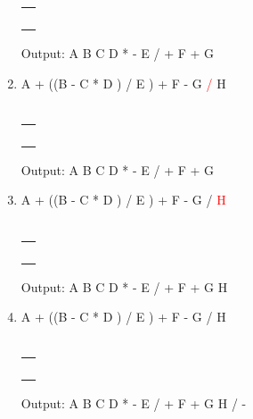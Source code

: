 \documentclass[a4paper]{article}
\begin{document}
\begin{large}
\begin{enumerate}
\begin{tabular}[t]{ | p{1em} | }
            \makecell{}  \\ \hline
            \makecell{}  \\ \hline
            \makecell{}  \\ \hline
            \\ \hline
            \makecell{-} \\ \hline
          \end{tabular}
          \hspace{2em}
          Output: A B C D * - E / + F + G
    \item
          A + ((B - C * D ) / E ) + F - G \textcolor{red}{/} H\\
          \\
          \begin{tabular}[t]{ | p{1em} | }
            \makecell{}  \\ \hline
            \makecell{}  \\ \hline
            \makecell{}  \\ \hline
            \makecell{/} \\ \hline
            \makecell{-} \\ \hline
          \end{tabular}
          \hspace{2em}
          Output: A B C D * - E / + F + G
    \item
          A + ((B - C * D ) / E ) + F - G / \textcolor{red}{H}\\
          \\
          \begin{tabular}[t]{ | p{1em} | }
            \makecell{}  \\ \hline
            \makecell{}  \\ \hline
            \makecell{}  \\ \hline
            \makecell{/} \\ \hline
            \makecell{-} \\ \hline
          \end{tabular}
          \hspace{2em}
          Output: A B C D * - E / + F + G H
    \item
          A + ((B - C * D ) / E ) + F - G / H\\
          \\
          \begin{tabular}[t]{ | p{1em} | }
            \makecell{} \\ \hline
            \makecell{} \\ \hline
            \makecell{} \\ \hline
            \makecell{} \\ \hline
            \makecell{} \\ \hline
          \end{tabular}
          \hspace{2em}
          Output: A B C D * - E / + F + G H / -
  \end{enumerate}


\end{large}
\end{document}
